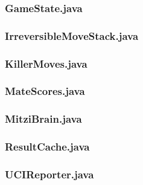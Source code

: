 \documentclass [12pt ,a4paper, english]{scrartcl}
\theoremstyle{plain}
\theoremstyle{definition}
\theoremstyle{remark}
\begin{document}
\subsubsection{GameState.java}


\subsubsection{IrreversibleMoveStack.java}


\subsubsection{KillerMoves.java}


\subsubsection{MateScores.java}


\subsubsection{MitziBrain.java}
\label{sec:mitzibrain}


\subsubsection{ResultCache.java}


\subsubsection{UCIReporter.java}

\end{document}
